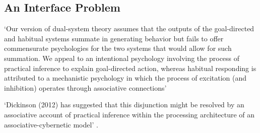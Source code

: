 \documentclass[12pt]{extarticle}
\begin{document}
\begin{multicols*}{3}
 

\section{An Interface Problem}

‘Our version of dual-system theory assumes that the outputs of the goal-directed and habitual systems summate in generating behavior but fails to offer commensurate psychologies for the two systems that would allow for such summation. 
We appeal to an intentional psychology involving the process of practical inference to explain goal-directed action, 
 whereas habitual responding is attributed to a mechanistic psychology in which the process of excitation (and inhibition) operates through associative connections’ 
\citep[p.~19]{dickinson:2018_actions}
 
‘Dickinson (2012) has suggested that this disjunction might be resolved by an associative account of practical inference within the processing architecture of an associative-cybernetic model’
\citep[p.~19]{dickinson:2018_actions}.
 

    

\footnotesize


\end{multicols*}
\end{document}
